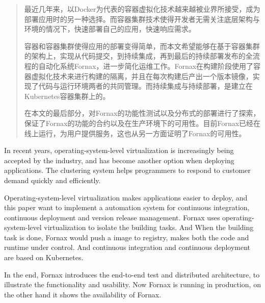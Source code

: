 
\begin{abstract}
\thispagestyle{front}

最近几年来，以Docker为代表的容器虚拟化技术越来越被业界所接受，成为部署应用时的另一种选择。而容器集群技术使得开发者无需关注底层架构与环境的情况下，快速部署自己的应用，快速响应需求。

容器和容器集群使得应用的部署变得简单，而本文希望能够在基于容器集群的架构上，实现从代码提交，到持续集成，再到最后的持续部署发布的全流程的自动化系统Fornax，进一步简化运维工作。Fornax在构建阶段使用了容器虚拟化技术来进行构建的隔离，并且在每次构建后产出一个版本镜像，实现了代码与运行环境两者的共同管理。而持续集成与持续部署，是建立在Kubernetes容器集群上的。

在本文的最后部分，对Fornax的功能性测试以及分布式的部署进行了探索，保证了Fornax的功能的合约以及在生产环境下的可用性。目前Fornax已经在线上运行，为用户提供服务，这也从另一方面证明了Fornax的可用性。

\end{abstract}

\begin{englishabstract}
\thispagestyle{front}

In recent years, operating-system-level virtualization is increasingly being accepted by the industry, and has become another option when deploying applications. The clustering system helps programmers to respond to customer demand quickly and efficiently.

Operating-system-level virtualization makes applications easier to deploy, and this paper want to implement a automation system for continuous integration, continuous deployment and version release management. Fornax uses operating-system-level virtualization to isolate the building tasks. And When the building task is done, Fornax would push a image to registry, makes both the code and runtime under control. And continuous integration and continuous deployment are based on Kubernetes.

In the end, Fornax introduces the end-to-end test and distributed architecture, to illustrate the functionality and usability. Now Fornax is running in production, on the other hand it shows the availability of Fornax.

\end{englishabstract}
